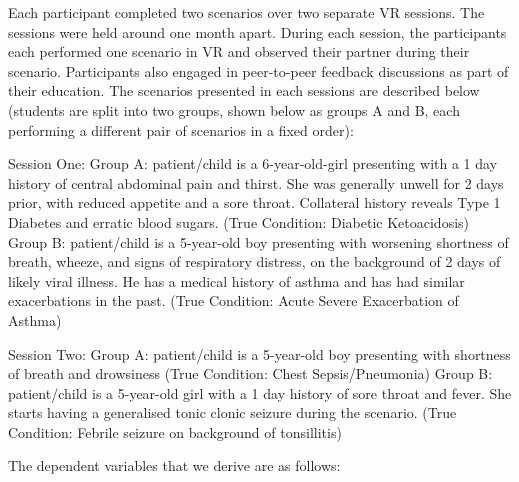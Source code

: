 \documentclass[a4paper, nobind]{templates/ociamthesis}
\begin{document}
Each participant completed two scenarios over two separate VR sessions. The sessions were held around one month apart. During each session, the participants each performed one scenario in VR and observed their partner during their scenario. Participants also engaged in peer-to-peer feedback discussions as part of their education. The scenarios presented in each sessions are described below (students are split into two groups, shown below as groups A and B, each performing a different pair of scenarios in a fixed order):

Session One:
Group A: patient/child is a 6-year-old-girl presenting with a 1 day history of central abdominal pain and thirst. She was generally unwell for 2 days prior, with reduced appetite and a sore throat. Collateral history reveals Type 1 Diabetes and erratic blood sugars. (True Condition: Diabetic Ketoacidosis)
Group B: patient/child is a 5-year-old boy presenting with worsening shortness of breath, wheeze, and signs of respiratory distress, on the background of 2 days of likely viral illness. He has a medical history of asthma and has had similar exacerbations in the past. (True Condition: Acute Severe Exacerbation of Asthma)

Session Two:
Group A: patient/child is a 5-year-old boy presenting with shortness of breath and drowsiness (True Condition: Chest Sepsis/Pneumonia)
Group B: patient/child is a 5-year-old girl with a 1 day history of sore throat and fever. She starts having a generalised tonic clonic seizure during the scenario. (True Condition: Febrile seizure on background of tonsillitis)

The dependent variables that we derive are as follows:
\end{document}
